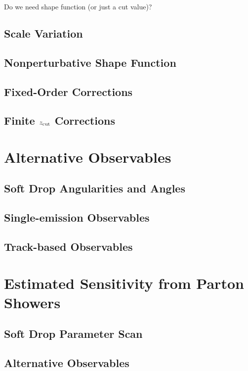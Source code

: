 \documentclass[11pt,letterpaper]{article}
\begin{document}
	Do we need shape function (or just a cut value)?

\subsection{Scale Variation}

\subsection{Nonperturbative Shape Function}

\subsection{Fixed-Order Corrections}

\subsection{Finite $z_{\rm cut}$ Corrections}


\section{Alternative Observables}

\subsection{Soft Drop Angularities and Angles}

\subsection{Single-emission Observables}

\subsection{Track-based Observables}

\section{Estimated Sensitivity from Parton Showers}

\subsection{Soft Drop Parameter Scan}

\subsection{Alternative Observables}
\end{document}
